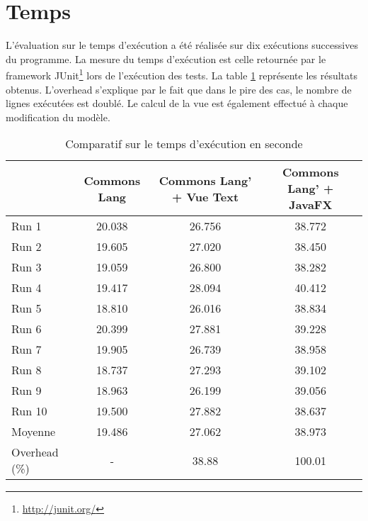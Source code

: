 \section{Temps}
\label{temps}

L'évaluation sur le temps d'exécution a été réalisée sur dix exécutions successives du programme. La mesure du temps d'exécution est celle retournée par le framework JUnit\footnote{\url{http://junit.org/}} lors de l'exécution des tests. La table \ref{evaluation_temps} représente les résultats obtenus. L'overhead s'explique par le fait que dans le pire des cas, le nombre de lignes exécutées est doublé. Le calcul de la vue est également effectué à chaque modification du modèle.

\begin{table}[H]
\centering
\begin{tabular}{|l|c|c|c|}
\hline
         & Commons Lang & Commons Lang' + Vue Text & Commons Lang' + JavaFX\\
         \hline
Run 1     & 20.038  & 26.756       & 38.772        \\
Run 2     & 19.605  & 27.020       & 38.450        \\
Run 3     & 19.059  & 26.800       & 38.282        \\
Run 4     & 19.417  & 28.094       & 40.412        \\
Run 5     & 18.810  & 26.016       & 38.834        \\
Run 6     & 20.399  & 27.881       & 39.228        \\
Run 7     & 19.905  & 26.739       & 38.958        \\
Run 8     & 18.737  & 27.293       & 39.102        \\
Run 9     & 18.963  & 26.199       & 39.056        \\
Run 10    & 19.500  & 27.882       & 38.637        \\
\hline
Moyenne  & 19.486  & 27.062       & 38.973        \\
\hline
Overhead (\%) & -  & 38.88       & 100.01   \\
\hline    
\end{tabular}
\caption{Comparatif sur le temps d'exécution en seconde}
\label{evaluation_temps}
\end{table}
